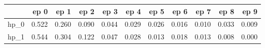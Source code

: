 \begin{tabular}{lrrrrrrrrrr}
\toprule
{} &   ep 0 &   ep 1 &   ep 2 &   ep 3 &   ep 4 &   ep 5 &   ep 6 &   ep 7 &   ep 8 &   ep 9 \\
\midrule
hp\_0 &  0.522 &  0.260 &  0.090 &  0.044 &  0.029 &  0.026 &  0.016 &  0.010 &  0.033 &  0.009 \\
hp\_1 &  0.544 &  0.304 &  0.122 &  0.047 &  0.028 &  0.013 &  0.018 &  0.013 &  0.008 &  0.000 \\
\bottomrule
\end{tabular}
